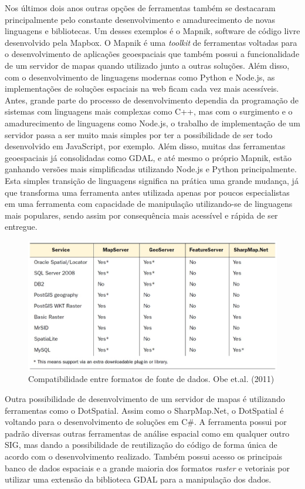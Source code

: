 		Nos últimos dois anos outras opções de ferramentas também se destacaram principalmente pelo constante desenvolvimento e amadurecimento de novas linguagens e bibliotecas. Um desses exemplos é o Mapnik, software de código livre desenvolvido pela Mapbox. O Mapnik é uma \textit{toolkit} de ferramentas voltadas para o desenvolvimento de aplicações geoespaciais que também possui a funcionalidade de um servidor de mapas quando utilizado junto a outras soluções. Além disso, com o desenvolvimento de linguagens modernas como Python e Node.js, as implementações de soluções espaciais na web ficam cada vez mais acessíveis. Antes, grande parte do processo de desenvolvimento dependia da programação de sistemas com linguagens mais complexas como C++, mas com o surgimento e o amadurecimento de linguagens como Node.js, o trabalho de implementação de um servidor passa a ser muito mais simples por ter a possibilidade de ser todo desenvolvido em JavaScript, por exemplo. Além disso, muitas das ferramentas geoespaciais já consolidadas como GDAL, e até mesmo o próprio Mapnik, estão ganhando versões mais simplificadas utilizando Node.js e Python principalmente. Esta simples transição de linguagens significa na prática uma grande mudança, já que transforma uma ferramenta antes utilizada apenas por poucos especialistas em uma ferramenta com capacidade de manipulação utilizando-se de linguagens mais populares, sendo assim por consequência mais acessível e rápida de ser entregue. 
		
		\begin{figure}
			\centering
			\includegraphics[width=1\linewidth]{data/compatibilidade_formatos}
			\caption{Compatibilidade entre formatos de fonte de dados. Obe et.al. (2011)}
			\label{fig:compatibilidadeformatos}
		\end{figure}
		
		Outra possibilidade de desenvolvimento de um servidor de mapas é utilizando ferramentas como o DotSpatial. Assim como o SharpMap.Net, o DotSpatial é voltando para o desenvolvimento de soluções em C\#. A ferramenta possui por padrão diversas outras ferramentas de análise espacial como em qualquer outro SIG, mas dando a possibilidade de reutilização do código de forma única de acordo com o desenvolvimento realizado. Também possui acesso os principais banco de dados espaciais e a grande maioria dos formatos \textit{raster} e vetoriais por utilizar uma extensão da biblioteca GDAL para a manipulação dos dados.
		
